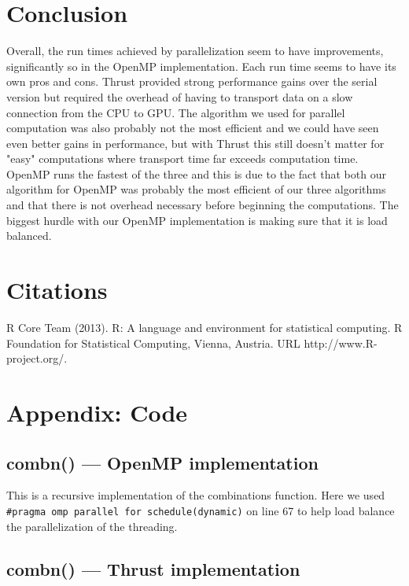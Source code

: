 \documentclass[titlepage, 11pt]{article}
\begin{document}
\section{Conclusion}
Overall, the run times achieved by parallelization seem to have improvements, significantly so in the OpenMP implementation. Each run time seems to have its own pros and cons. Thrust provided strong performance gains over the serial version but required the overhead of having to transport data on a slow connection from the CPU to GPU. The algorithm we used for parallel computation was also probably not the most efficient and we could have seen even better gains in performance, but with Thrust this still doesn't matter for "easy" computations where transport time far exceeds computation time. OpenMP runs the fastest of the three and this is due to the fact that both our algorithm for OpenMP was probably the most efficient of our three algorithms and that there is not overhead necessary before beginning the computations. The biggest hurdle with our OpenMP implementation is making sure that it is load balanced.


\section{Citations}
  R Core Team (2013). R: A language and environment for statistical computing. R Foundation for Statistical
  Computing, Vienna, Austria. URL http://www.R-project.org/.

\pagebreak
\appendix
\section{Appendix: Code}
\subsection{combn() --- OpenMP implementation}

This is a recursive implementation of the combinations function. Here we used \\
 \verb;#pragma omp parallel for schedule(dynamic); on line 67 to help load balance the parallelization of the threading.  \\

\subsection{combn() --- Thrust implementation}

\end{document}
